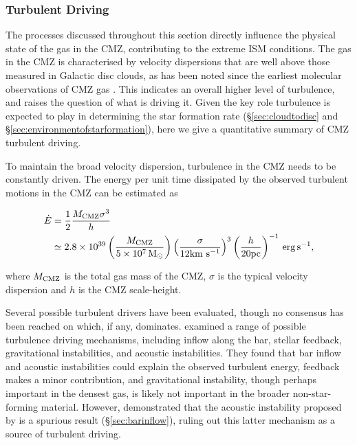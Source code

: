\subsubsection{Turbulent Driving}
\label{sec:turbulentdriving}
The processes discussed throughout this section directly influence the physical state of the gas in the CMZ, contributing to the extreme ISM conditions.
The gas in the CMZ is characterised by velocity dispersions that are well above those measured in Galactic disc clouds, as has been noted since the earliest molecular observations of CMZ gas \citep{Bally1987}. This indicates an overall higher level of turbulence, and raises the question of what is driving it. Given the key role turbulence is expected to play in determining the star formation rate (\S\ref{sec:cloudtodisc} and \S\ref{sec:environmentofstarformation}), here we give a quantitative summary of CMZ turbulent driving.

To maintain the broad velocity dispersion, turbulence in the CMZ needs to be constantly driven.
The energy per unit time dissipated by the observed turbulent motions in the CMZ can be estimated as \citep[e.g.][]{MacLow2004} 

\setlength{\mathindent}{0pt}

\begin{footnotesize}

\begin{align} \label{eq:turb1}
    \dot{E} &= \frac{1}{2} \frac{M_\mathrm{CMZ} \sigma^{3}}{h} \nonumber \\
    & \simeq 2.8 \times 10^{39} \left(\frac{M_{\rm CMZ}}{5\times10^7\, \mbox{M$_\odot$}} \right) \left(\frac{\sigma}{12 \mbox{${\rm km}~{\rm s}^{-1}$}}\right)^3 \left(\frac{h}{20\mbox{${\rm pc}$}}\right)^{-1}  \, \mathrm{erg\,s^{-1}},
\end{align}
\end{footnotesize}
%
where $M_{\rm CMZ}$ is the total gas mass of the CMZ, $\sigma$ is the typical velocity dispersion and $h$ is the CMZ scale-height.  

Several possible turbulent drivers have been evaluated, though no consensus has been reached on which, if any, dominates.
\cite{Kruijssen2014a} examined a range of possible turbulence driving mechanisms, including inflow along the bar, stellar feedback, gravitational instabilities, and acoustic instabilities. 
They found that bar inflow and acoustic instabilities could explain the observed turbulent energy, feedback makes a minor contribution, and gravitational instability, though perhaps important in the densest gas, is likely not important in the broader non-star-forming material.
However, \cite{Sormani2020c} demonstrated that the acoustic instability proposed by \citet{Montenegro1999} is a spurious result (\S\ref{sec:barinflow}), ruling out this latter mechanism as a source of turbulent driving.


